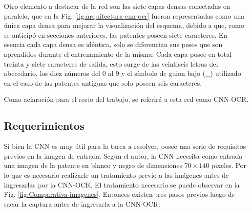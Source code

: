 Otro elemento a destacar de la red son las siete capas densas conectadas en paralelo, que en la Fig. \ref{fig:arquitectura-cnn-ocr} fueron representadas como una única capa densa para mejorar la visualización del esquema, debido a que, como se anticipó en secciones anteriores, las patentes poseen siete caracteres. En esencia cada capa densa es idéntica, solo se diferencian sus pesos que son aprendidos durante el entrenamiento de la misma. Cada capa posee en total treinta y siete caracteres de salida, esto surge de las veintiseis letras del abecedario, los diez números del 0 al 9 y el símbolo de guion bajo (\_) utilizado en el caso de las patentes antiguas que solo poseen seis caracteres.

Como aclaración para el resto del trabajo, se referirá a esta red como CNN-OCR.

\subsection{Requerimientos}

Si bien la CNN es muy útil para la tarea a resolver, posee una serie de requisitos previos en la imagen de entrada. Según el autor, la CNN
necesita como entrada una imagen de la patente en blanco y negro de dimensiones $70 \times 140$ pixeles.
Por lo que es necesario realizarle un tratamiento previo a las imágenes antes de ingresarlas por la CNN-OCR. El tratamiento necesario
se puede observar en la Fig. \ref{fig:Comparativa-imagenes}. Entonces existen tres pasos previos luego de sacar
la captura antes de ingresarla a la CNN-OCR:

